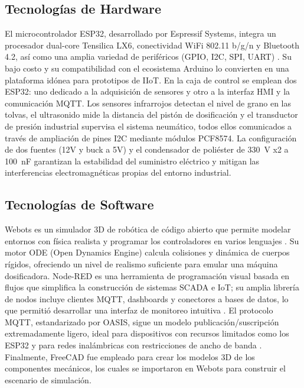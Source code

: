 \subsection*{Tecnologías de Hardware}
El microcontrolador ESP32, desarrollado por Espressif Systems, integra un procesador dual-core Tensilica LX6, conectividad WiFi 802.11 b/g/n y Bluetooth 4.2, así como una amplia variedad de periféricos (GPIO, I2C, SPI, UART) \cite{espressif2024datasheet}. Su bajo costo y su compatibilidad con el ecosistema Arduino lo convierten en una plataforma idónea para prototipos de IIoT. En la caja de control se emplean dos ESP32: uno dedicado a la adquisición de sensores y otro a la interfaz HMI y la comunicación MQTT. Los sensores infrarrojos detectan el nivel de grano en las tolvas, el ultrasonido mide la distancia del pistón de dosificación y el transductor de presión industrial supervisa el sistema neumático, todos ellos comunicados a través de ampliación de pines I2C mediante módulos PCF8574. La configuración de dos fuentes (12V y buck a 5V) y el condensador de poliéster de 330~V x2 a 100~nF garantizan la estabilidad del suministro eléctrico y mitigan las interferencias electromagnéticas propias del entorno industrial.

\subsection*{Tecnologías de Software}
Webots es un simulador 3D de robótica de código abierto que permite modelar entornos con física realista y programar los controladores en varios lenguajes \cite{michel2004webots}. Su motor ODE (Open Dynamics Engine) calcula colisiones y dinámica de cuerpos rígidos, ofreciendo un nivel de realismo suficiente para emular una máquina dosificadora. Node-RED es una herramienta de programación visual basada en flujos que simplifica la construcción de sistemas SCADA e IoT; su amplia librería de nodos incluye clientes MQTT, dashboards y conectores a bases de datos, lo que permitió desarrollar una interfaz de monitoreo intuitiva \cite{blackstock2014distributed}. El protocolo MQTT, estandarizado por OASIS, sigue un modelo publicación/suscripción extremadamente ligero, ideal para dispositivos con recursos limitados como los ESP32 y para redes inalámbricas con restricciones de ancho de banda \cite{hunkeler2008mqtts}. Finalmente, FreeCAD fue empleado para crear los modelos 3D de los componentes mecánicos, los cuales se importaron en Webots para construir el escenario de simulación.

